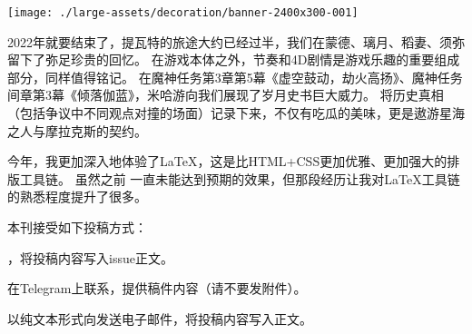


\isDraft
\noindent\texttt{[image: ./large-assets/decoration/banner-2400x300-001]}\par
\tableofcontents\clearpage






\dividearticles
{}

2022年就要结束了，提瓦特的旅途大约已经过半，我们在蒙德、璃月、稻妻、须弥留下了弥足珍贵的回忆。
在游戏本体之外，节奏和4D剧情是游戏乐趣的重要组成部分，同样值得铭记。
在魔神任务第3章第5幕《虚空鼓动，劫火高扬》、魔神任务间章第3幕《倾落伽蓝》，米哈游向我们展现了岁月史书巨大威力。
将历史真相（包括争议中不同观点对撞的场面）记录下来，不仅有吃瓜的美味，更是遨游星海之人与摩拉克斯的契约。

今年，我更加深入地体验了LaTeX，这是比HTML+CSS更加优雅、更加强大的排版工具链。
虽然之前\href{https://neruthesgithubdistweb.vercel.app/qyxt/qyxt/qyxt-2022-02.pdf}{}%
一直未能达到预期的效果，但那段经历让我对LaTeX工具链的熟悉程度提升了很多。


本刊接受如下投稿方式：

\begin{compactitem}
	\item \href{https://github.com/neruthes/ysplayerjournal}{}，将投稿内容写入issue正文。
	\item 在Telegram上联系\CJKecglue\href{https://t.me/neruthes}{}，提供稿件内容（请不要发附件）。
	\item 以纯文本形式向发送电子邮件，将投稿内容写入正文。
\end{compactitem}


